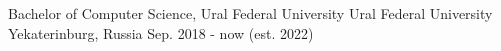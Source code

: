 

\begin{cventries}

  \cventry
    {Bachelor of Computer Science, Ural Federal University} %
    {Ural Federal University} %
    {Yekaterinburg, Russia} %
    {Sep. 2018 - now (est. 2022)} %
    {
    }
\end{cventries}
